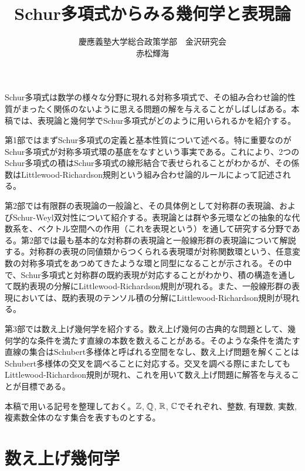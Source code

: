 \documentclass{ltjsarticle}
\title{Schur多項式からみる幾何学と表現論}
\author{慶應義塾大学総合政策学部　金沢研究会\\赤松輝海}
\date{}
\begin{document}
\maketitle
Schur多項式は数学の様々な分野に現れる対称多項式で、その組み合わせ論的性質がまったく関係のないように思える問題の解を与えることがしばしばある。本稿では、表現論と幾何学でSchur多項式がどのように用いられるかを紹介する。


第1部ではまずSchur多項式の定義と基本性質について述べる。特に重要なのがSchur多項式が対称多項式環の基底をなすという事実である。これにより、2つのSchur多項式の積はSchur多項式の線形結合で表せられることがわかるが、その係数はLittlewood-Richardson規則という組み合わせ論的ルールによって記述される。


第2部では有限群の表現論の一般論と、その具体例として対称群の表現論、およびSchur-Weyl双対性について紹介する。表現論とは群や多元環などの抽象的な代数系を、ベクトル空間への作用（これを表現という）を通して研究する分野である。第2部では最も基本的な対称群の表現論と一般線形群の表現論について解説する。対称群の表現の同値類からつくられる表現環が対称関数環という、任意変数の対称多項式をあつめてきたような環と同型になることが示される。その中で、Schur多項式と対称群の既約表現が対応することがわかり、積の構造を通して既約表現の分解にLittlewood-Richardson規則が現れる。また、一般線形群の表現においては、既約表現のテンソル積の分解にLittlewood-Richardson規則が現れる。


第3部では数え上げ幾何学を紹介する。数え上げ幾何の古典的な問題として、幾何学的な条件を満たす直線の本数を数えることがある。そのような条件を満たす直線の集合はSchubert多様体と呼ばれる空間をなし、数え上げ問題を解くことはSchubert多様体の交叉を調べることに対応する。交叉を調べる際にまたしてもLittlewood-Richardson規則が現れ、これを用いて数え上げ問題に解答を与えることが目標である。


本稿で用いる記号を整理しておく。$\mathbb{Z}$, $\mathbb{Q}$, $\mathbb{R}$, $\mathbb{C}$でそれぞれ、整数, 有理数, 実数, 複素数全体のなす集合を表すものとする。

\newpage
\tableofcontents

\newpage



\newpage


\newpage
\part{数え上げ幾何学}


\newpage

\end{document}
